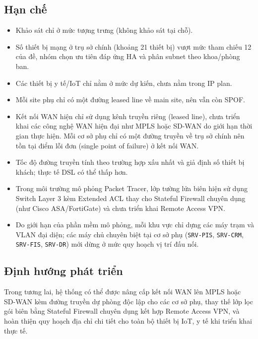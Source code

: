 \subsection{Hạn chế}
\begin{itemize}
    \item Khảo sát chỉ ở mức tượng trưng (không khảo sát tại chỗ).
    \item Số thiết bị mạng ở trụ sở chính (khoảng 21 thiết bị) vượt mức tham chiếu 12 của đề, nhóm chọn ưu tiên đáp ứng HA và phân subnet theo khoa/phòng ban.
    \item Các thiết bị y tế/IoT chỉ nằm ở mức dự kiến, chưa nằm trong IP plan.
    \item Mỗi site phụ chỉ có một đường leased line về main site, nên vẫn còn SPOF.
    \item Kết nối WAN hiện chỉ sử dụng kênh truyền riêng (leased line), chưa triển khai các công nghệ WAN hiện đại như MPLS hoặc SD-WAN do giới hạn thời gian thực hiện. Mỗi cơ sở phụ chỉ có một đường truyền về trụ sở chính nên tồn tại điểm lỗi đơn (single point of failure) ở kết nối WAN.
    \item Tốc độ đường truyền tính theo trường hợp xấu nhất và giả định số thiết bị khách; thực tế DSL có thể thấp hơn.
    \item Trong môi trường mô phỏng Packet Tracer, lớp tường lửa biên hiện sử dụng Switch Layer 3 kèm Extended ACL thay cho Stateful Firewall chuyên dụng (như Cisco ASA/FortiGate) và chưa triển khai Remote Access VPN.
    \item Do giới hạn của phần mềm mô phỏng, mỗi khu vực chỉ dựng các máy trạm và VLAN đại diện; các máy chủ chuyên biệt tại cơ sở phụ (\texttt{SRV-PIS}, \texttt{SRV-CRM}, \texttt{SRV-FIS}, \texttt{SRV-DR}) mới dừng ở mức quy hoạch vị trí đấu nối.
\end{itemize}

\subsection{Định hướng phát triển}
Trong tương lai, hệ thống có thể được nâng cấp kết nối WAN lên MPLS hoặc SD-WAN kèm đường truyền dự phòng độc lập cho các cơ sở phụ, thay thế lớp lọc gói biên bằng Stateful Firewall chuyên dụng kết hợp Remote Access VPN, và hoàn thiện quy hoạch địa chỉ chi tiết cho toàn bộ thiết bị IoT, y tế khi triển khai thực tế.